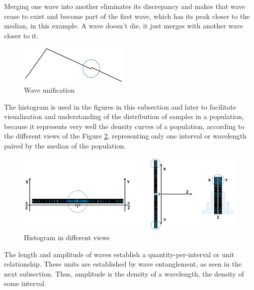Merging one wave into another eliminates its discrepancy and makes that wave cease to exist and become part of the first wave, which has its peak closer to the median, in this example. A wave doesn't die, it just merges with another wave closer to it.
	\begin{figure}[H]
	\caption{Wave unification}
	\label{fig:consciousness_uniform_wave}
	\centering
	\includegraphics[scale=1]{sections/images/consciousness_uniform_wave.jpg}
	\end{figure}

The histogram is used in the figures in this subsection and later to facilitate visualization and understanding of the distribution of samples in a population, because it represents very well the density curves of a population, according to the different views of the Figure \ref{fig:consciousness_wave_histogram}, representing only one interval or wavelength paired by the median of the population.  
	\begin{figure}[H]
	\caption{Histogram in different views}
	\label{fig:consciousness_wave_histogram}
	\centering
	\includegraphics[scale=.7]{sections/images/consciousness_wave_histogram.jpg}
	\end{figure}
The length and amplitude of waves establish a quantity-per-interval or unit relationship. These units are established by wave entanglement, as seen in the next subsection. Thus, amplitude is the density of a wavelength, the density of some interval.  

